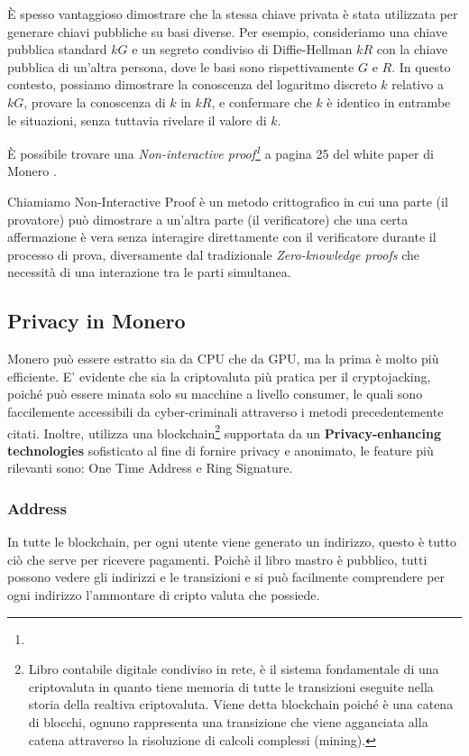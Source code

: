 \documentclass[12pt,a4paper]{article}
\begin{document}
È spesso vantaggioso dimostrare che la stessa chiave privata è stata utilizzata
per generare chiavi pubbliche su basi diverse. Per esempio, consideriamo una
chiave pubblica standard $kG$ e un segreto condiviso di Diffie-Hellman $kR$ con
la chiave pubblica di un'altra persona, dove le basi sono rispettivamente $G$ e
$R$. In questo contesto, possiamo dimostrare la conoscenza del logaritmo
discreto $k$ relativo a $kG$, provare la conoscenza di $k$ in $kR$, e confermare
che $k$ è identico in entrambe le situazioni, senza tuttavia rivelare il valore
di $k$.

È possibile trovare una \textit{Non-interactive proof\footnote{}} a pagina 25
del white paper di Monero \cite{Zero To Monero}.

Chiamiamo Non-Interactive Proof è un metodo crittografico in cui una parte (il
provatore) può dimostrare a un'altra parte (il verificatore) che una certa
affermazione è vera senza interagire direttamente con il verificatore durante il
processo di prova, diversamente dal tradizionale \textit{Zero-knowledge proofs}
che necessità di una interazione tra le parti simultanea.

\subsection{Privacy in Monero}
Monero può essere estratto sia da CPU che da GPU, ma la prima è molto più
efficiente. E' evidente che sia la criptovaluta più pratica per il
cryptojacking, poiché può essere minata solo su macchine a livello consumer, le
quali sono faccilemente accessibili da cyber-criminali attraverso i metodi
precedentemente citati. Inoltre, utilizza una blockchain\footnote{Libro
contabile digitale condiviso in rete, è il sistema fondamentale di una
criptovaluta in quanto tiene memoria di tutte le transizioni eseguite nella
storia della realtiva criptovaluta. Viene detta blockchain poiché è una catena
di blocchi, ognuno rappresenta una transizione che viene agganciata alla catena
attraverso la risoluzione di calcoli complessi (mining).} supportata da un
\textbf{Privacy-enhancing technologies} sofisticato al fine di fornire privacy e
anonimato, le feature più rilevanti sono: One Time Address e Ring Signature.

\subsubsection{Address}
In tutte le blockchain, per ogni utente viene generato un indirizzo, questo è
tutto ciò che serve per ricevere pagamenti. Poichè il libro mastro è pubblico,
tutti possono vedere gli indirizzi e le transizioni e si può facilmente
comprendere per ogni indirizzo l'ammontare di cripto valuta che possiede.
\end{document}
